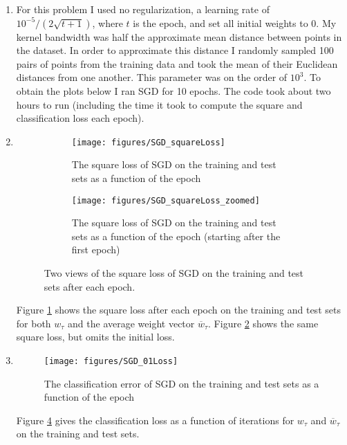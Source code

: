 \documentclass{article}
\begin{document}
\begin{enumerate}
	\item For this problem I used no regularization, a learning rate of $10^{-5} / (2\sqrt{t+1})$, where $t$ is the epoch, and set all initial weights to 0. My kernel bandwidth was half the approximate mean distance between points in the dataset. In order to approximate this distance I randomly sampled 100 pairs of points from the training data and took the mean of their Euclidean distances from one another. This parameter was on the order of $10^3$. To obtain the plots below I ran SGD for 10 epochs. The code took about two hours to run (including the time it took to compute the square and classification loss each epoch).

	\item
	\begin{figure}
		\centering
		\begin{subfigure}{0.49\textwidth}
			\centering
			\texttt{[image: figures/SGD\_squareLoss]}
			\caption{The square loss of SGD on the training and test sets as a function of the epoch}
			\label{fig:SGD_squareLoss_overview}
		\end{subfigure}
		\begin{subfigure}{0.49\textwidth}
			\centering
			\texttt{[image: figures/SGD\_squareLoss\_zoomed]}
			\caption{The square loss of SGD on the training and test sets as a function of the epoch (starting after the first epoch)}
			\label{fig:SGD_squareLoss_zoomed}
		\end{subfigure}
		\caption{Two views of the square loss of SGD on the training and test sets after each epoch.}
		\label{fig:SGD_squareloss}
	\end{figure}
	Figure \ref{fig:SGD_squareLoss_overview} shows the square loss after each epoch on the training and test sets for both $w_\tau$ and the average weight vector $\overline w_\tau$. Figure \ref{fig:SGD_squareLoss_zoomed} shows the same square loss, but omits the initial loss.

	\item
	\begin{figure}
		\centering
		\texttt{[image: figures/SGD\_01Loss]}
		\caption{The classification error of SGD on the training and test sets as a function of the epoch} 
		\label{fig:figures/SGD_01Loss}
	\end{figure}
	Figure \ref{fig:figures/SGD_01Loss} gives the classification loss as a function of iterations for $w_\tau$ and $\overline w_\tau$ on the training and test sets.


\end{enumerate}
\end{document}
